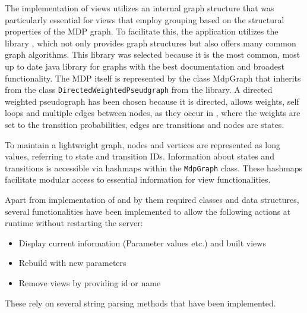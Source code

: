 \documentclass[preview]{standalone}
\begin{document}
The implementation of views utilizes an internal graph structure that was particularly essential for views that employ grouping based on the structural properties of the MDP graph. To facilitate this, the application utilizes the \jgrapht library \cite{Michail2020}, which not only provides graph structures but also offers many common graph algorithms. This library was selected because it is the most common, most up to date java library for graphs with the best documentation and broadest functionality. The MDP itself is represented by the class MdpGraph that inherits from the class \texttt{DirectedWeightedPseudgraph} from the \jgrapht library. A directed weighted pseudograph has been chosen because it is directed, allows weights, self loops and multiple edges between nodes, as they occur in \chgphsN, where the weights are set to the transition probabilities, edges are transitions and nodes are states.

To maintain a lightweight graph, nodes and vertices are represented as long values, referring to state and transition IDs. Information about states and transitions is accessible via hashmaps within the \texttt{MdpGraph} class. These hashmaps facilitate modular access to essential information for view functionalities.

Apart from implementation of \viewsN and by them required classes and data structures, several functionalities have been implemented to allow the following actions at runtime without restarting the server: 
\begin{itemize}
	\item Display current \viewN information (Parameter values etc.) and built views
	\item Rebuild \viewN with new parameters
	\item Remove views by providing id or name		
\end{itemize}

These rely on several string parsing methods that have been implemented.
\end{document}
